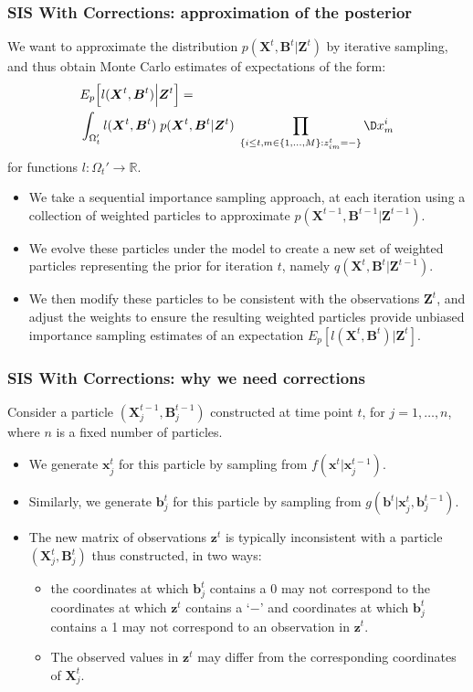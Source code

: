 \documentclass[9pt, xcolor={dvipsnames,svgnames,table}]{beamer}
\newcommand{\Real}{\mathbb R}
\begin{document}
\begin{frame}
    \frametitle{SIS With Corrections: approximation of the posterior}
    We want to approximate the distribution $p(\bm{X}^{t}, \bm{B}^{t} | \bm{Z}^{t})$ by iterative sampling, and thus obtain Monte Carlo estimates of expectations of the form:
    \begin{align*}
        &E_{p} \Big[l(\bm{X}^{t}, \bm{B}^{t} ) \Big| \bm{Z}^{t} \Big] = \\
        &\int_{\Omega_t'} l(\bm{X}^{t}, \bm{B}^{t})\; p(\bm{X}^{t}, \bm{B}^{t} | \bm{Z}^{t})\; \prod_{ \{ i \leq t, m \in \{1, \ldots, M \} : z^t_{im} = - \} } \D x^i_m
    \end{align*}
    for functions $l: \Omega_t' \rightarrow \Real$. 
    \begin{itemize}
        \item We take a sequential importance sampling approach, at each iteration using a collection of weighted particles to approximate $p(\bm{X}^{t-1}, \bm{B}^{t-1} | \bm{Z}^{t-1})$.
        \item We evolve these particles under the model to create a new set of weighted particles representing the prior for iteration $t$, namely $q(\bm{X}^{t}, \bm{B}^{t} | \bm{Z}^{t-1})$.
        \item We then modify these particles to be consistent with the observations $\bm{Z}^{t}$, and adjust the weights to ensure the resulting weighted particles provide unbiased importance sampling estimates of an expectation $E_{p}[l(\bm{X}^{t}, \bm{B}^t) | \bm{Z}^t]$.
    \end{itemize}
\end{frame}

\begin{frame}
    \frametitle{SIS With Corrections: why we need corrections}
    Consider a particle $(\bm{X}^{t-1}_j,\bm{B}^{t-1}_j)$ constructed at time point $t$, for $j = 1, \ldots, n$, where $n$ is a fixed number of particles.
    \begin{itemize}
        \item We generate $\bm{x}^t_j$ for this particle by sampling from $f(\bm{x}^t | \bm{x}^{t-1}_j)$.
        \item Similarly, we generate $\bm{b}^{t}_j$ for this particle by sampling from $g(\bm{b}^{t} | \bm{x}^t_j, \bm{b}^{t-1}_j)$.
        \item The new matrix of observations $\bm{z}^{t}$ is typically inconsistent with a particle $(\bm{X}^{t}_j, \bm{B}^{t}_j)$ thus constructed, in two ways:
        \begin{itemize}
            \item the coordinates at which $\bm{b}^{t}_j$ contains a 0 may not correspond to the coordinates at which $\bm{z}^{t}$ contains a `$-$' and coordinates at which $\bm{b}^{t}_j$ contains a 1 may not correspond to an observation in $\bm{z}^{t}$.
            \item The observed values in $\bm{z}^{t}$ may differ from the corresponding coordinates of $\bm{X}^{t}_j$.
        \end{itemize}
    \end{itemize}
\end{frame}
    
\end{document}
